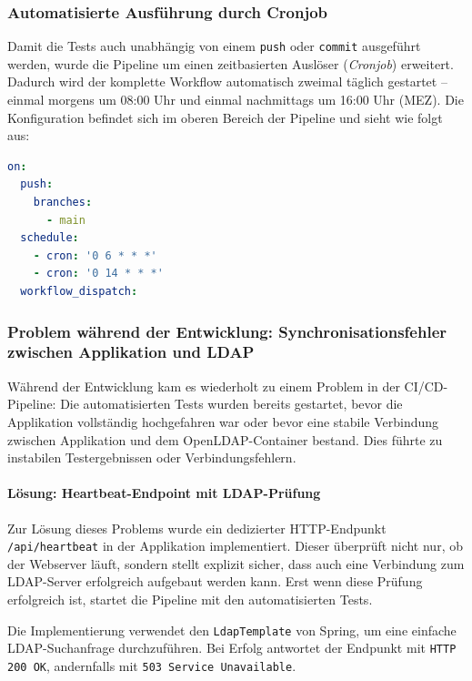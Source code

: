 \subsubsection{Automatisierte Ausführung durch Cronjob}
Damit die Tests auch unabhängig von einem \texttt{push} oder \texttt{commit} ausgeführt werden, wurde die Pipeline um einen zeitbasierten Auslöser (\textit{Cronjob}) erweitert. Dadurch wird der komplette Workflow automatisch zweimal täglich gestartet – einmal morgens um 08:00 Uhr und einmal nachmittags um 16:00 Uhr (MEZ). Die Konfiguration befindet sich im oberen Bereich der Pipeline und sieht wie folgt aus:

\begin{lstlisting}[language=yaml, caption={Cronjob-Integration in der GitHub Actions Pipeline}]
on:
  push:
    branches:
      - main
  schedule:
    - cron: '0 6 * * *'
    - cron: '0 14 * * *'
  workflow_dispatch:
\end{lstlisting}

\subsubsection{Problem während der Entwicklung: Synchronisationsfehler zwischen Applikation und LDAP}

Während der Entwicklung kam es wiederholt zu einem Problem in der CI/CD-Pipeline: Die automatisierten Tests wurden bereits gestartet, bevor die Applikation vollständig hochgefahren war oder bevor eine stabile Verbindung zwischen Applikation und dem OpenLDAP-Container bestand. Dies führte zu instabilen Testergebnissen oder Verbindungsfehlern.

\paragraph{Lösung: Heartbeat-Endpoint mit LDAP-Prüfung}

Zur Lösung dieses Problems wurde ein dedizierter HTTP-Endpunkt \texttt{/api/heartbeat} in der Applikation implementiert. Dieser überprüft nicht nur, ob der Webserver läuft, sondern stellt explizit sicher, dass auch eine Verbindung zum LDAP-Server erfolgreich aufgebaut werden kann. Erst wenn diese Prüfung erfolgreich ist, startet die Pipeline mit den automatisierten Tests.

Die Implementierung verwendet den \texttt{LdapTemplate} von Spring, um eine einfache LDAP-Suchanfrage durchzuführen. Bei Erfolg antwortet der Endpunkt mit \texttt{HTTP 200 OK}, andernfalls mit \texttt{503 Service Unavailable}.


